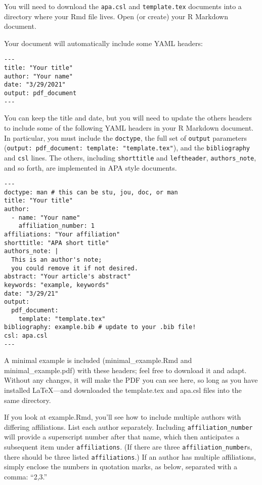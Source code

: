 \documentclass[jou]{apa7}
\begin{document}
You will need to download the \texttt{apa.csl} and \texttt{template.tex}
documents into a directory where your Rmd file lives. Open (or create)
your R Markdown document.

Your document will automatically include some YAML headers:

\begin{verbatim}
---
title: "Your title"
author: "Your name"
date: "3/29/2021"
output: pdf_document
---
\end{verbatim}

You can keep the title and date, but you will need to update the others
headers to include some of the following YAML headers in your R Markdown
document. In particular, you must include the \texttt{doctype}, the full
set of \texttt{output} parameters
(\texttt{output:\ pdf\_document:\ template:\ "template.tex"}), and the
\texttt{bibliography} and \texttt{csl} lines. The others, including
\texttt{shorttitle} and \texttt{leftheader}, \texttt{authors\_note}, and
so forth, are implemented in APA style documents.

\begin{verbatim}
---
doctype: man # this can be stu, jou, doc, or man
title: "Your title"
author: 
  - name: "Your name"
    affiliation_number: 1
affiliations: "Your affiliation"
shorttitle: "APA short title"
authors_note: |
  This is an author's note; 
  you could remove it if not desired. 
abstract: "Your article's abstract"
keywords: "example, keywords"
date: "3/29/21"
output: 
  pdf_document:
    template: "template.tex"
bibliography: example.bib # update to your .bib file!
csl: apa.csl
---
\end{verbatim}

A minimal example is included (minimal\_example.Rmd and
minimal\_example.pdf) with these headers; feel free to download it and
adapt. Without any changes, it will make the PDF you can see here, so
long as you have installed LaTeX---and downloaded the template.tex and
apa.csl files into the same directory.

If you look at example.Rmd, you'll see how to include multiple authors
with differing affiliations. List each author separately. Including
\texttt{affiliation\_number} will provide a superscript number after
that name, which then anticipates a subsequent item under
\texttt{affiliations}. (If there are three
\texttt{affiliation\_number}s, there should be three listed
\texttt{affiliations}.) If an author has multiple affiliations, simply
enclose the numbers in quotation marks, as below, separated with a
comma: ``2,3.''
\end{document}
